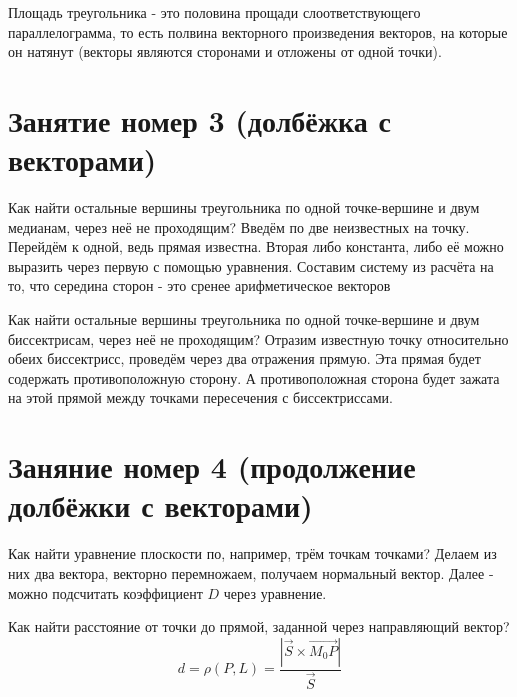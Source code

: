 \documentclass[12pt, a4paper]{article}
\begin{document}
    Площадь треугольника  - это половина прощади слоответствующего параллелограмма, то есть полвина векторного произведения векторов, на которые он натянут 
    (векторы являются сторонами и отложены от одной точки).

    \section{Занятие номер 3 (долбёжка с векторами)}
    
    
    Как найти остальные вершины треугольника по одной точке-вершине и двум медианам, через неё не проходящим? 
    Введём по две неизвестных на точку. Перейдём к одной, ведь прямая известна. Вторая либо константа, либо её можно выразить через первую с помощью уравнения. 
    Составим систему из расчёта на то, что середина сторон - это сренее арифметическое векторов

    Как найти остальные вершины треугольника по одной точке-вершине и двум биссектрисам, через неё не проходящим?
    Отразим известную точку относительно обеих биссектрисс, проведём через два отражения прямую. Эта прямая будет содержать противоположную сторону.
	А противоположная сторона будет зажата на этой прямой между точками пересечения с биссектриссами.

	\section{Заняние номер 4 (продолжение долбёжки с векторами)}
 
	Как найти уравнение плоскости по, например, трём точкам точками? Делаем из них два вектора, векторно перемножаем, получаем нормальный вектор.
	Далее - можно подсчитать коэффициент $D$ через уравнение.

	Как найти расстояние от точки до прямой, заданной через направляющий вектор?
	\begin{equation}
		d = \rho(P, L) = \frac{|\vec{S} \times \vec{M_0 P}|}{\vec{S}}
	\end{equation}
\end{document}
